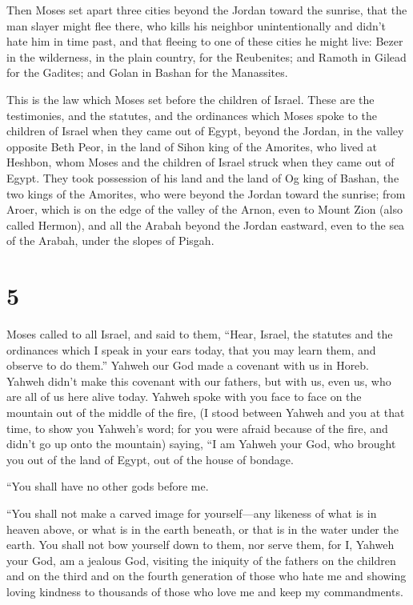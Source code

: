  Then Moses set apart three cities beyond the Jordan toward
the sunrise,  that the man slayer might flee there, who
kills his neighbor unintentionally and didn't hate him in time past, and
that fleeing to one of these cities he might live:  Bezer
in the wilderness, in the plain country, for the Reubenites; and Ramoth
in Gilead for the Gadites; and Golan in Bashan for the Manassites.

 This is the law which Moses set before the children of
Israel.  These are the testimonies, and the statutes, and
the ordinances which Moses spoke to the children of Israel when they
came out of Egypt,  beyond the Jordan, in the valley
opposite Beth Peor, in the land of Sihon king of the Amorites, who lived
at Heshbon, whom Moses and the children of Israel struck when they came
out of Egypt.  They took possession of his land and the
land of Og king of Bashan, the two kings of the Amorites, who were
beyond the Jordan toward the sunrise;  from Aroer, which is
on the edge of the valley of the Arnon, even to Mount Zion (also called
Hermon),  and all the Arabah beyond the Jordan eastward,
even to the sea of the Arabah, under the slopes of Pisgah.

\hypertarget{section-4}{%
\section{5}\label{section-4}}

 Moses called to all Israel, and said to them, ``Hear,
Israel, the statutes and the ordinances which I speak in your ears
today, that you may learn them, and observe to do them.'' 
Yahweh our God made a covenant with us in Horeb.  Yahweh
didn't make this covenant with our fathers, but with us, even us, who
are all of us here alive today.  Yahweh spoke with you face
to face on the mountain out of the middle of the fire,  (I
stood between Yahweh and you at that time, to show you Yahweh's word;
for you were afraid because of the fire, and didn't go up onto the
mountain) saying,  ``I am Yahweh your God, who brought you
out of the land of Egypt, out of the house of bondage.

 ``You shall have no other gods before me.

 ``You shall not make a carved image for yourself---any
likeness of what is in heaven above, or what is in the earth beneath, or
that is in the water under the earth.  You shall not bow
yourself down to them, nor serve them, for I, Yahweh your God, am a
jealous God, visiting the iniquity of the fathers on the children and on
the third and on the fourth generation of those who hate me
 and showing loving kindness to thousands of those who love
me and keep my commandments.

